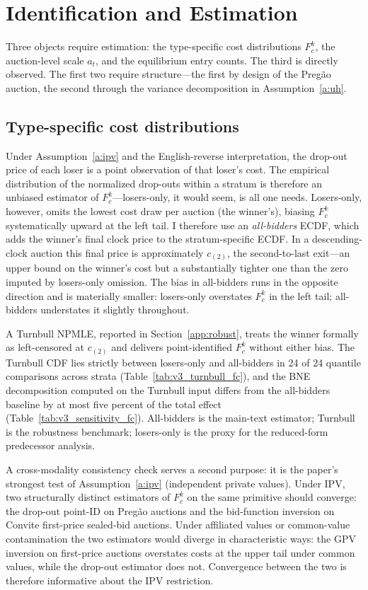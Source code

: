 \section{Identification and Estimation}\label{sec:identification}

Three objects require estimation: the type-specific cost distributions $F_c^k$, the auction-level scale $a_t$, and the equilibrium entry counts. The third is directly observed. The first two require structure---the first by design of the Preg\~ao auction, the second through the variance decomposition in Assumption~\ref{a:uh}.

\subsection{Type-specific cost distributions}

Under Assumption~\ref{a:ipv} and the English-reverse interpretation, the drop-out price of each loser is a point observation of that loser's cost. The empirical distribution of the normalized drop-outs within a stratum is therefore an unbiased estimator of $F_c^k$---losers-only, it would seem, is all one needs. Losers-only, however, omits the lowest cost draw per auction (the winner's), biasing $F_c^k$ systematically upward at the left tail. I therefore use an \emph{all-bidders} ECDF, which adds the winner's final clock price to the stratum-specific ECDF. In a descending-clock auction this final price is approximately $c_{(2)}$, the second-to-last exit---an upper bound on the winner's cost but a substantially tighter one than the zero imputed by losers-only omission. The bias in all-bidders runs in the opposite direction and is materially smaller: losers-only overstates $F_c^k$ in the left tail; all-bidders understates it slightly throughout.

A Turnbull NPMLE, reported in Section~\ref{app:robust}, treats the winner formally as left-censored at $c_{(2)}$ and delivers point-identified $F_c^k$ without either bias. The Turnbull CDF lies strictly between losers-only and all-bidders in 24 of 24 quantile comparisons across strata (Table~\ref{tab:v3_turnbull_fc}), and the BNE decomposition computed on the Turnbull input differs from the all-bidders baseline by at most five percent of the total effect (Table~\ref{tab:v3_sensitivity_fc}). All-bidders is the main-text estimator; Turnbull is the robustness benchmark; losers-only is the proxy for the reduced-form predecessor analysis.

A cross-modality consistency check serves a second purpose: it is the paper's strongest test of Assumption~\ref{a:ipv} (independent private values). Under IPV, two structurally distinct estimators of $F_c^k$ on the same primitive should converge: the \citet{haile2003} drop-out point-ID on Preg\~ao auctions and the \citet{gpv2000} bid-function inversion on Convite first-price sealed-bid auctions. Under affiliated values or common-value contamination the two estimators would diverge in characteristic ways: the GPV inversion on first-price auctions overstates costs at the upper tail under common values, while the drop-out estimator does not. Convergence between the two is therefore informative about the IPV restriction.

